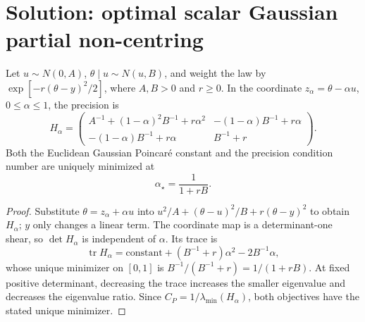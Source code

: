 \documentclass[../main.tex]{subfiles}
\begin{document}

\section*{Solution: optimal scalar Gaussian partial non-centring}

\begin{proposition}
Let $u\sim N(0,A)$, $\theta\mid u\sim N(u,B)$, and weight the law by
$\exp[-r(\theta-y)^2/2]$, where $A,B>0$ and $r\ge0$. In the coordinate
$z_\alpha=\theta-\alpha u$, $0\le\alpha\le1$, the precision is
\[
 H_\alpha=\begin{pmatrix}
 A^{-1}+(1-\alpha)^2B^{-1}+r\alpha^2&-(1-\alpha)B^{-1}+r\alpha\\
 -(1-\alpha)B^{-1}+r\alpha&B^{-1}+r
 \end{pmatrix}.
\]
Both the Euclidean Gaussian Poincar\'e constant and the precision condition number are uniquely
minimized at
\[
 \alpha_\star=\frac1{1+rB}.
\]
\end{proposition}

\begin{proof}
Substitute $\theta=z_\alpha+\alpha u$ into
$u^2/A+(\theta-u)^2/B+r(\theta-y)^2$ to obtain $H_\alpha$; $y$ only changes a linear term.
The coordinate map is a determinant-one shear, so $\det H_\alpha$ is independent of $\alpha$.
Its trace is
\[
 \operatorname{tr}H_\alpha
 =\text{constant}+(B^{-1}+r)\alpha^2-2B^{-1}\alpha,
\]
whose unique minimizer on $[0,1]$ is $B^{-1}/(B^{-1}+r)=1/(1+rB)$. At fixed positive
determinant, decreasing the trace increases the smaller eigenvalue and decreases the eigenvalue
ratio. Since $C_P=1/\lambda_{\min}(H_\alpha)$, both objectives have the stated unique minimizer.
\end{proof}
\end{document}
